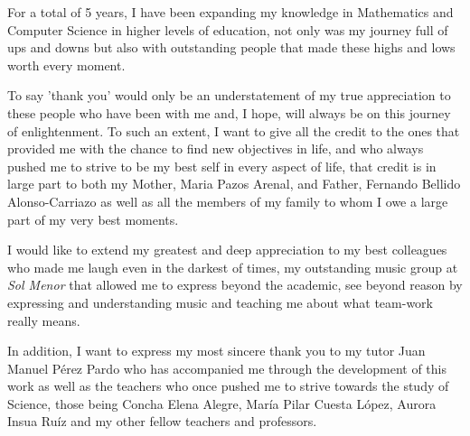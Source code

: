 For a total of 5 years, I have been expanding my knowledge in Mathematics and Computer Science in higher levels of education, not only was my journey full of ups and downs but also with outstanding people that made these highs and lows worth every moment. 

To say 'thank you' would only be an understatement of my true appreciation to these people who have been with me and, I hope, will always be on this journey of enlightenment. To such an extent, I want to give all the credit to the ones that provided me with the chance to find new objectives in life, and who always pushed me to strive to be my best self in every aspect of life, that credit is in large part to both my Mother, Maria Pazos Arenal, and Father, Fernando Bellido Alonso-Carriazo as well as all the members of my family to whom I owe a large part of my very best moments.

I would like to extend my greatest and deep appreciation to my best colleagues who made me laugh even in the darkest of times, my outstanding music group at \textit{Sol Menor} that allowed me to express beyond the academic, see beyond reason by expressing and understanding music and teaching me about what team-work really means.

In addition, I want to express my most sincere thank you to my tutor Juan Manuel Pérez Pardo who has accompanied me through the development of this work as well as the teachers who once pushed me to strive towards the study of Science, those being Concha Elena Alegre, María Pilar Cuesta López, Aurora Insua Ruíz and my other fellow teachers and professors.
